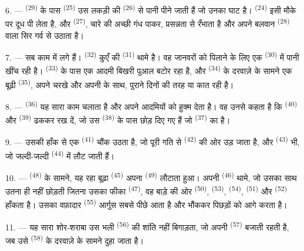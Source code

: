 6. ---  \textsuperscript{(29)} के पास 
\textsuperscript{(25)} उस लकड़ी की  \textsuperscript{(26)} से पानी
पीने जाती हैं जो उनका घाट है।  \textsuperscript{(24)} इसी मौके पर
दूध पी लेता है, और  \textsuperscript{(27)}, चारे की अच्छी गंध पाकर,
प्रसन्नता से रँभाता है और अपने बलवान  \textsuperscript{(28)} वाला
सिर गर्व से उठाता है।

7. --- सब काम में लगे हैं।  \textsuperscript{(32)} कुएँ की
 \textsuperscript{(31)} थामे है। वह जानवरों को पिलाने के लिए एक
 \textsuperscript{(30)} में पानी खींच रही है। 
\textsuperscript{(33)} के पास एक आदमी बिखरी पुआल बटोर रहा है, और
 \textsuperscript{(34)} के दरवाज़े के सामने एक बूढ़ी
 \textsuperscript{(35)}, अपने चरखे और अपनी  के
साथ, पुराने दिनों की तरह  या  कात रही है।

\VUsaut{3.0mm}
\VUsaut{3.0mm}

8. ---  \textsuperscript{(36)} यह सारा काम चलाता है और अपने
आदमियों को हुक्म देता है। वह उनसे कहता है कि  \textsuperscript{(40)}
और  \textsuperscript{(39)} ढककर रख दें, जो उस 
\textsuperscript{(38)} के पास छोड़ दिए गए हैं जो 
\textsuperscript{(37)} का है।

9. --- उसकी हाँक से एक  \textsuperscript{(41)} चौंक उठता है, जो
पूरी गति से  \textsuperscript{(42)} की ओर उड़ जाता है, और
 \textsuperscript{(43)} भी, जो जल्दी-जल्दी
 \textsuperscript{(44)} में लौट जाती हैं।

10. ---  \textsuperscript{(48)} के सामने, यह रहा बूढ़ा
 \textsuperscript{(45)} अपना  \textsuperscript{(49)}
लौटाता हुआ। अपनी  \textsuperscript{(46)} थामे, जो उसका साथ उतना ही
नहीं छोड़ती जितना उसका फीका  \textsuperscript{(47)}, वह बाड़े की ओर
 \textsuperscript{(50)},  \textsuperscript{(53)},
 \textsuperscript{(54)},  \textsuperscript{(51)} और
 \textsuperscript{(52)} हाँकता है। उसका वफ़ादार
 \textsuperscript{(55)} आर्गुस सबसे पीछे आता है और भौंककर पिछड़ों
को आगे करता है।

11. --- यह सारा शोर-शराबा उस भली  \textsuperscript{(56)} की
शांति नहीं बिगाड़ता, जो अपनी  \textsuperscript{(57)} बजाती रहती है, जब उसे
 \textsuperscript{(58)} के दरवाज़े के सामने दुहा जाता है।

